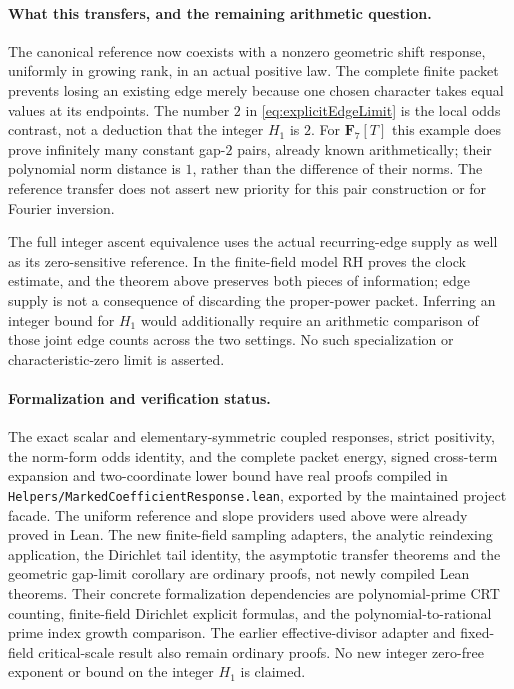 \documentclass[11pt]{article}
\newcommand{\F}{\mathbf F}
\begin{document}
\paragraph{What this transfers, and the remaining arithmetic question.}
The canonical reference now coexists with a nonzero geometric shift
response, uniformly in growing rank, in an actual positive law.
The complete finite packet prevents losing an existing edge merely
because one chosen character takes equal values at its endpoints.
The number \(2\) in \eqref{eq:explicitEdgeLimit} is the local odds
contrast, not a deduction that the integer \(H_1\) is \(2\).
For \(\F_7[T]\) this example does prove infinitely many constant
gap-\(2\) pairs, already known arithmetically; their polynomial
norm distance is \(1\), rather than the difference of their norms.
The reference transfer does not assert new priority for this pair
construction or for Fourier inversion.

The full integer ascent equivalence uses the actual recurring-edge
supply as well as its zero-sensitive reference. In the finite-field
model RH proves the clock estimate, and the theorem above preserves
both pieces of information; edge supply is not a consequence of
discarding the proper-power packet. Inferring an integer bound for
\(H_1\) would additionally require an arithmetic comparison of those
joint edge counts across the two settings. No such specialization
or characteristic-zero limit is asserted.

\paragraph{Formalization and verification status.}
The exact scalar and elementary-symmetric coupled responses, strict
positivity, the norm-form odds identity, and the complete packet energy,
signed cross-term expansion and two-coordinate lower bound have
real proofs compiled in
\texttt{Helpers/MarkedCoefficientResponse.lean}, exported by the
maintained project facade. The uniform reference and slope providers
used above were already proved in Lean. The new finite-field sampling
adapters, the analytic reindexing application, the Dirichlet tail
identity, the asymptotic transfer theorems and the geometric gap-limit
corollary are ordinary proofs, not newly compiled Lean theorems. Their concrete
formalization dependencies are polynomial-prime CRT counting,
finite-field Dirichlet explicit formulas, and the polynomial-to-rational
prime index growth comparison. The earlier effective-divisor adapter
and fixed-field critical-scale result also remain ordinary proofs.
No new integer zero-free exponent or bound on the integer \(H_1\)
is claimed.
\end{document}
